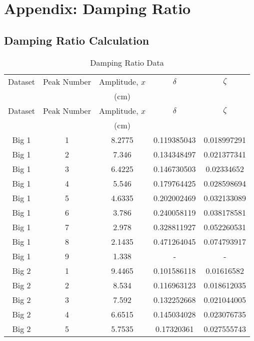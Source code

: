 \section{Appendix: Damping Ratio}
\label{app:Damping Ratio Calculation}


\subsection{Damping Ratio Calculation}
\begin{longtable}{ccccc}
    \caption{Damping Ratio Data}
    \label{tab:damping_ratio} \\
    \toprule
    Dataset & Peak Number & Amplitude, $x$ & $\delta$ & $\zeta$ \\
    & & (cm) & & \\
    \midrule
    \endfirsthead
    \toprule
    Dataset & Peak Number & Amplitude, $x$ & $\delta$ & $\zeta$ \\
    & & (cm) & & \\
    \midrule
    \endhead
    \bottomrule
    \endfoot
    Big 1 & 1 & 8.2775 & 0.119385043 & 0.018997291 \\
    Big 1 & 2 & 7.346 & 0.134348497 & 0.021377341 \\
    Big 1 & 3 & 6.4225 & 0.146730503 & 0.02334652 \\
    Big 1 & 4 & 5.546 & 0.179764425 & 0.028598694 \\
    Big 1 & 5 & 4.6335 & 0.202002469 & 0.032133089 \\
    Big 1 & 6 & 3.786 & 0.240058119 & 0.038178581 \\
    Big 1 & 7 & 2.978 & 0.328811927 & 0.052260531 \\
    Big 1 & 8 & 2.1435 & 0.471264045 & 0.074793917 \\
    Big 1 & 9 & 1.338 & - & - \\
    Big 2 & 1 & 9.4465 & 0.101586118 & 0.01616582 \\
    Big 2 & 2 & 8.534 & 0.116963123 & 0.018612035 \\
    Big 2 & 3 & 7.592 & 0.132252668 & 0.021044005 \\
    Big 2 & 4 & 6.6515 & 0.145034028 & 0.023076735 \\
    Big 2 & 5 & 5.7535 & 0.17320361 & 0.027555743 \\

\end{longtable}
